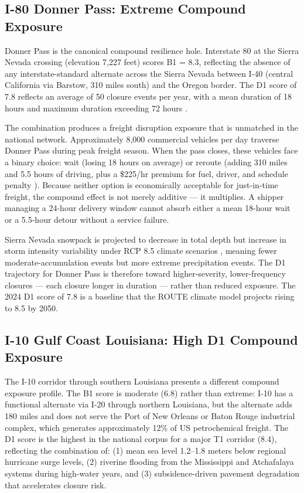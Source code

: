 \subsection{I-80 Donner Pass: Extreme Compound Exposure}

Donner Pass is the canonical compound resilience hole. Interstate 80 at the Sierra Nevada crossing (elevation 7,227 feet) scores B1 = 8.3, reflecting the absence of any interstate-standard alternate across the Sierra Nevada between I-40 (central California via Barstow, 310 miles south) and the Oregon border. The D1 score of 7.8 reflects an average of 50 closure events per year, with a mean duration of 18 hours and maximum duration exceeding 72 hours \citep{Caltrans2023}.

The combination produces a freight disruption exposure that is unmatched in the national network. Approximately 8,000 commercial vehicles per day traverse Donner Pass during peak freight season. When the pass closes, these vehicles face a binary choice: wait (losing 18 hours on average) or reroute (adding 310 miles and 5.5 hours of driving, plus a \$225/hr premium for fuel, driver, and schedule penalty \citep{ATRI_costs2024}). Because neither option is economically acceptable for just-in-time freight, the compound effect is not merely additive --- it multiplies. A shipper managing a 24-hour delivery window cannot absorb either a mean 18-hour wait or a 5.5-hour detour without a service failure.

Sierra Nevada snowpack is projected to decrease in total depth but increase in storm intensity variability under RCP 8.5 climate scenarios \citep{NOAA_ClimateAtlas2022}, meaning fewer moderate-accumulation events but more extreme precipitation events. The D1 trajectory for Donner Pass is therefore toward higher-severity, lower-frequency closures --- each closure longer in duration --- rather than reduced exposure. The 2024 D1 score of 7.8 is a baseline that the ROUTE climate model projects rising to 8.5 by 2050.

\subsection{I-10 Gulf Coast Louisiana: High D1 Compound Exposure}

The I-10 corridor through southern Louisiana presents a different compound exposure profile. The B1 score is moderate (6.8) rather than extreme: I-10 has a functional alternate via I-20 through northern Louisiana, but the alternate adds 180 miles and does not serve the Port of New Orleans or Baton Rouge industrial complex, which generates approximately 12\% of US petrochemical freight. The D1 score is the highest in the national corpus for a major T1 corridor (8.4), reflecting the combination of: (1) mean sea level 1.2--1.8 meters below regional hurricane surge levels, (2) riverine flooding from the Mississippi and Atchafalaya systems during high-water years, and (3) subsidence-driven pavement degradation that accelerates closure risk.

